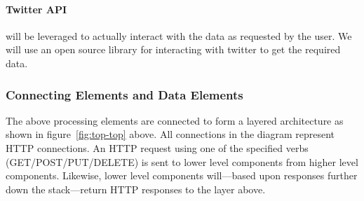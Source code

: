 \paragraph{Twitter API} will be leveraged to actually interact with the data as
requested by the user.  We will use an open source library for interacting with
twitter to get the required data.

\subsubsection{Connecting Elements and Data Elements}

The above processing elements are connected to form a layered architecture as
shown in figure~\ref{fig:top-top} above. All connections in the diagram
represent HTTP connections. An HTTP request using one of the specified verbs
(GET/POST/PUT/DELETE) is sent to lower level components from higher level
components. Likewise, lower level components will---based upon responses further
down the stack---return HTTP responses to the layer above.

